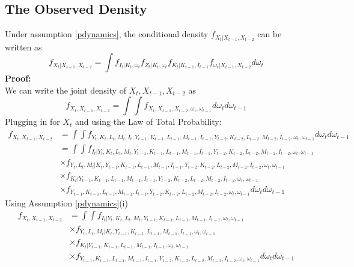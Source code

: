 \documentclass{article}
\begin{document}
\subsection*{The Observed Density}
Under assumption \eqref{pdynamics}, the conditional density $f_{X_{t}|X_{t-1}, X_{t-2}}$ can be written as
\begin{equation*}
f_{X_{t}|X_{t-1}, X_{t-2}}=\int f_{I_{t}|K_{t}, \omega_{t}}f_{Z_{t}|K_{t}, \omega_{t}}f_{K_{t}|K_{t-1}, I_{t-1}}f_{\omega_{t}|X_{t-1}, X_{t-2}}d\omega_{t}
\end{equation*}
\textbf{Proof:} \\
\noindent We can write the joint density of $X_{t}, X_{t-1}, X_{t-2}$ as
\begin{equation*}
f_{X_{t},X_{t-1}, X_{t-2}}=\int\int f_{X_{t},X_{t-1}, X_{t-2}, \omega_{t}, \omega_{t-1}}d\omega_{t}d\omega_{t-1}
\end{equation*}
Plugging in for $X_{t}$ and using the Law of Total Probability:
\begin{equation*}
\begin{split}
f_{X_{t},X_{t-1}, X_{t-2}}&=\int\int f_{Y_{t}, K_{t}, L_{t}, M_{t}, I_{t}, Y_{t-1}, K_{t-1}, L_{t-1}, M_{t-1}, I_{t-1}, Y_{t-2}, K_{t-2}, L_{t-2}, M_{t-2}, I_{t-2}, \omega_{t}, \omega_{t-1}}d\omega_{t}d\omega_{t-1}\\
&=\int\int f_{I_{t}|Y_{t}, K_{t}, L_{t}, M_{t}, Y_{t-1}, K_{t-1}, L_{t-1}, M_{t-1}, I_{t-1}, Y_{t-2}, K_{t-2}, L_{t-2}, M_{t-2}, I_{t-2}, \omega_{t}, \omega_{t-1}}\\
&\times f_{Y_{t}, L_{t}, M_{t}|K_{t}, Y_{t-1}, K_{t-1}, L_{t-1}, M_{t-1}, I_{t-1}, Y_{t-2}, K_{t-2}, L_{t-2}, M_{t-2}, I_{t-2}, \omega_{t}, \omega_{t-1}}\\
&\times f_{K_{t}|Y_{t-1}, K_{t-1}, L_{t-1}, M_{t-1}, I_{t-1}, Y_{t-2}, K_{t-2}, L_{t-2}, M_{t-2}, I_{t-2}, \omega_{t}, \omega_{t-1}}\\
&\times f_{Y_{t-1}, K_{t-1}, L_{t-1}, M_{t-1}, I_{t-1}, Y_{t-2}, K_{t-2}, L_{t-2}, M_{t-2}, I_{t-2}, \omega_{t}, \omega_{t-1}}d\omega_{t}d\omega_{t-1}
\end{split}
\end{equation*}
Using Assumption \eqref{pdynamics}(i)
\begin{equation*}
\begin{split}
f_{X_{t},X_{t-1}, X_{t-2}}&=\int\int f_{I_{t}|Y_{t}, K_{t}, L_{t}, M_{t}, Y_{t-1}, K_{t-1}, L_{t-1}, M_{t-1}, I_{t-1}, \omega_{t}, \omega_{t-1}}\\
&\times f_{Y_{t}, L_{t}, M_{t}|K_{t}, Y_{t-1}, K_{t-1}, L_{t-1}, M_{t-1}, I_{t-1}, \omega_{t}, \omega_{t-1}}\\
&\times f_{K_{t}|Y_{t-1}, K_{t-1}, L_{t-1}, M_{t-1}, I_{t-1}, \omega_{t}, \omega_{t-1}}\\
&\times f_{Y_{t-1}, K_{t-1}, L_{t-1}, M_{t-1}, I_{t-1}, Y_{t-2}, K_{t-2}, L_{t-2}, M_{t-2}, I_{t-2}, \omega_{t}, \omega_{t-1}}d\omega_{t}d\omega_{t-1}
\end{split}
\end{equation*}
\end{document}
